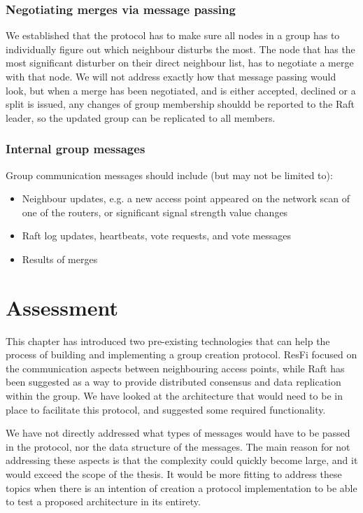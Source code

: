 \subsubsection{Negotiating merges via message passing}
We established that the protocol has to make sure all nodes in a group has to individually figure out which neighbour disturbs the most.
The node that has the most significant disturber on their direct neighbour list, has to negotiate a merge with that node. 
We will not address exactly how that message passing would look, but when a merge has been negotiated, and is either accepted, declined or a split is issued,
any changes of group membership shouldd be reported to the Raft leader, so the updated group can be replicated to all members. 

\subsubsection{Internal group messages}
Group communication messages should include (but may not be limited to):
			\begin{itemize}
				\item Neighbour updates, e.g. a new access point appeared on the network scan of one of the routers, or significant signal strength value changes
				\item Raft log updates, heartbeats, vote requests, and vote messages
				\item Results of merges 
			\end{itemize}
				
\section{Assessment}
This chapter has introduced two pre-existing technologies that can help the process of building and implementing a group creation protocol. ResFi focused on the communication aspects between
neighbouring access points, while Raft has been suggested as a way to provide distributed consensus and data replication within the group. We have looked at the architecture that
would need to be in place to facilitate this protocol, and suggested some required functionality. 

We have not directly addressed what types of messages would have to be passed in the protocol, nor the data structure of the messages. The main reason for not addressing these aspects is 
that the complexity could quickly become large, and it would exceed the scope of the thesis. It would be more fitting to address these topics when there is an intention of creation
a protocol implementation to be able to test a proposed architecture in its entirety.  

